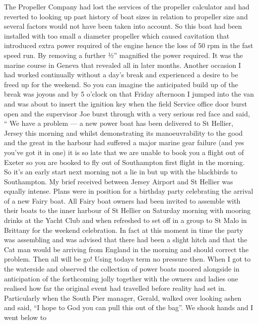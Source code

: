 
The Propeller Company had lost the services of the propeller calculator and had
reverted to looking up past history of boat sizes in relation to propeller size
and several factors would not have been taken into account.  So this boat had
been installed with too small a diameter propeller which caused cavitation that
introduced extra power required of the engine hence the loss of 50 rpm in the
fast speed run.  By removing a further ½'' magnified the power required.  It
was the marine course in Geneva that revealed all in later months. Another
occasion I had worked continually without a day's break and experienced a
desire to be freed up for the weekend.  So you can imagine the anticipated
build up of the break was joyous  and by 5 o'clock on that Friday afternoon I
jumped into the van and was about to insert the ignition key when the field
Service office door burst open and the supervisor Joe burst through with a very
serious red face and said, `` We have a problem --- a new power boat has been
delivered to St Hellier, Jersey this morning and whilst demonstrating its
manoeuvrability to the good and the great in the harbour had suffered a major
marine gear failure  (and yes you've got it in one) it is so late that we are
unable to book you a flight out of Exeter so you are booked to fly out of
Southampton first flight in the morning.  So it's an early start next morning
not a lie in but up with the blackbirds to Southampton.  My brief received
between Jersey Airport and St Hellier was equally intense. Plans were in
position for a birthday party celebrating the arrival of a new Fairy boat.  All
Fairy boat owners had been invited to assemble with their boats to the inner
harbour of St Hellier on Saturday morning with mooring drinks at the Yacht Club
and when refreshed to set off in a group to St Malo in Brittany for the weekend
celebration.  In fact at this moment in time the party was assembling and was
advised that there had been a slight hitch and that the Cat man would be
arriving from England in the morning and should correct the problem.  Then all
will be go!  Using todays term no pressure then.  When I got to the waterside
and observed the collection of power boats moored alongside in anticipation of
the forthcoming jolly together with the owners and ladies one realised how far
the original event had travelled before reality had set in.  Particularly when
the South Pier manager, Gerald, walked over looking ashen and said, ``I hope to
God you can pull this out of the bag''.  We shook hands and I went below to
